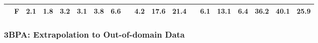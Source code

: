 \documentclass{article}
\begin{document}
\begin{table}
{\begin{tabular}{@{}llcccccccccccc | cc || ccc @{}}
       & F & 2.1                                         & \textbf{1.8}               & 3.2                                       & 3.1              & 3.8    & 6.6                   &  & 4.2                       & 17.6                     & 21.4                     &  & 6.1                          & 13.1                   & 6.4                           & 36.2             & 40.1                & \textbf{25.9} \\
      \bottomrule
    \end{tabular}
  }
\end{table}

\subsubsection{3BPA: Extrapolation to Out-of-domain Data}
\end{document}
